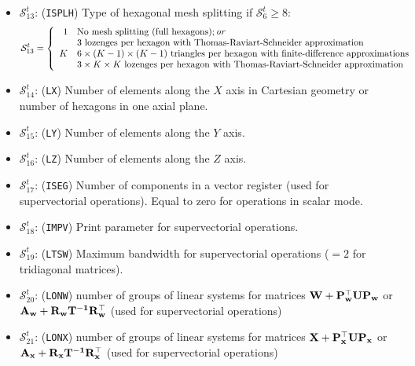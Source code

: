 \begin{itemize}
\item $\mathcal{S}^{t}_{13}$: ({\tt ISPLH}) Type of hexagonal mesh splitting if $\mathcal{S}^{t}_{6}\ge 8$:
\begin{displaymath}
\mathcal{S}^{t}_{13} = \left\{
\begin{array}{rl}
 1 & \textrm{No mesh splitting (full hexagons)}; \emph{or} \\
   & \textrm{$3$ lozenges per hexagon with Thomas-Raviart-Schneider approximation} \\
 K & \textrm{$6\times(K-1)\times(K-1)$ triangles per hexagon with finite-difference approximations} \\
   & \textrm{$3\times K \times K$ lozenges per hexagon with Thomas-Raviart-Schneider approximation}
\end{array} \right.
\end{displaymath}

\item $\mathcal{S}^{t}_{14}$: ({\tt LX}) Number of elements along the $X$ axis in Cartesian geometry or number of
hexagons in one axial plane.

\item $\mathcal{S}^{t}_{15}$: ({\tt LY}) Number of elements along the $Y$ axis.

\item $\mathcal{S}^{t}_{16}$: ({\tt LZ}) Number of elements along the $Z$ axis.

\item $\mathcal{S}^{t}_{17}$: ({\tt ISEG}) Number of components in a vector
register (used
for supervectorial operations). Equal to zero for operations in scalar mode.

\item $\mathcal{S}^{t}_{18}$: ({\tt IMPV}) Print parameter for supervectorial operations.

\item $\mathcal{S}^{t}_{19}$: ({\tt LTSW}) Maximum bandwidth for supervectorial operations ($=2$ for
tridiagonal matrices).

\item $\mathcal{S}^{t}_{20}$: ({\tt LONW}) number of groups of linear systems for matrices
$\bf{W}+\bf{P}_w^\top \bf{U}\bf{P}_w$ or $\bf{A}_w+\bf{R}_w\bf{T}^{-1}\bf{R}_w^\top$ (used
for supervectorial operations)

\item $\mathcal{S}^{t}_{21}$: ({\tt LONX})  number of groups of linear systems for matrices
$\bf{X}+\bf{P}_x^\top \bf{U}\bf{P}_x$ or $\bf{A}_x+\bf{R}_x\bf{T}^{-1}\bf{R}_x^\top$ (used
for supervectorial operations)


\end{itemize}
